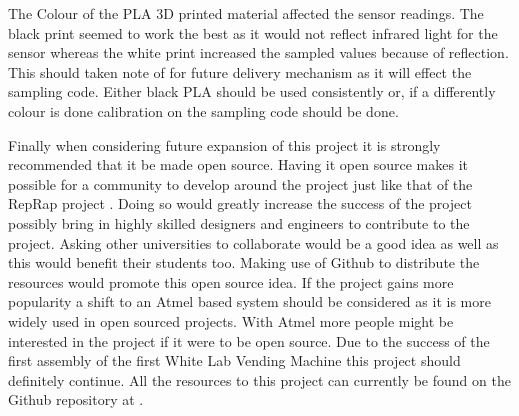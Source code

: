 \documentclass[a4paper,11pt]{article}
\numberwithin{figure}{section}
\numberwithin{table}{section}
\begin{document}
The Colour of the PLA 3D printed material affected the sensor readings. The black print seemed to work the best as it would not reflect infrared light for the sensor whereas the white print increased the sampled values because of reflection. This should taken note of for future delivery mechanism as it will effect the sampling code. Either black PLA should be used consistently or, if a differently colour is done calibration on the sampling code should be done.

Finally when considering future expansion of this project it is strongly recommended that it be made open source. Having it open source makes it possible for a community to develop around the project just like that of the RepRap project \cite{reprap}. Doing so would greatly increase the success of the project possibly bring in highly skilled designers and engineers to contribute to the project. Asking other universities to collaborate would be a good idea as well as this would benefit their students too. Making use of Github to distribute the resources would promote this open source idea. If the project gains more popularity a shift to an Atmel based system should be considered as it is more widely used in open sourced projects. With Atmel more people might be interested in the project if it were to be open source. Due to the success of the first assembly of the first White Lab Vending Machine this project should definitely continue. All the resources to this project can currently be found on the Github repository at \cite{github}.
\newpage




\newpage
\end{document}
